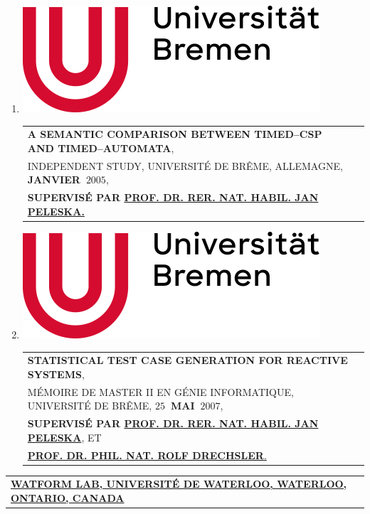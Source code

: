 \documentclass[9pt,a4paper]{article} %
\makeatletter
\newcommand{\headerrow}[2]
{\begin{tabular*}{\linewidth}{l@{\extracolsep{\fill}}r}
	#1 &
	#2 \\
\end{tabular*}}
\newcommand{\headerrowONE}[1]{\headerrow{#1}{}}
\newcommand{\yerothUNIBREMENitem}[1]
{
	\item \includegraphics[scale=0.05]{YEROTH-LOGO-UNI-BREMEN-2021.png} #1
}
\makeatother
\begin{document}
\begin{enumerate}
	\yerothUNIBREMENitem
		\headerrowONE{\textbf{A SEMANTIC COMPARISON BETWEEN TIMED--CSP AND TIMED--AUTOMATA},\\
	INDEPENDENT STUDY, UNIVERSITÉ DE BRÊME, ALLEMAGNE, \textbf{JANVIER~$2005$},\\
	\textbf{SUPERVISÉ PAR \href{http://www.informatik.uni-bremen.de/agbs/jp}
		{PROF. DR. RER. NAT. HABIL. JAN PELESKA.}}}
 
	\yerothUNIBREMENitem
		 \headerrowONE{\textbf{STATISTICAL TEST CASE GENERATION FOR REACTIVE SYSTEMS},\\
	MÉMOIRE DE MASTER II EN GÉNIE INFORMATIQUE, UNIVERSITÉ DE BRÊME, \textbf{$25$~MAI~$2007$},\\
	\textbf{SUPERVISÉ PAR \href{http://www.informatik.uni-bremen.de/agbs/jp}{
	PROF. DR. RER. NAT. HABIL. JAN PELESKA}}, ET\\
	\href{http://www.rolfdrechsler.de}{\textbf{PROF. DR. PHIL. NAT. ROLF DRECHSLER}.}}
\end{enumerate}


\vspace{1em}


\headerrowONE{\href{http://watform.uwaterloo.ca}{
	\textbf{WATFORM LAB, UNIVERSITÉ DE WATERLOO, WATERLOO, ONTARIO, CANADA}}}

\vspace{0.3em}
\end{document}
